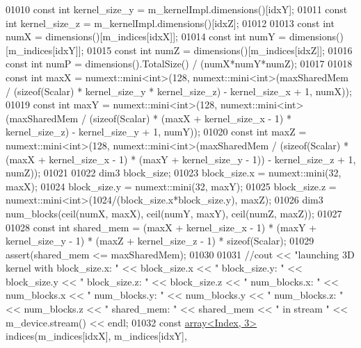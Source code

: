 \begin{DoxyCode}
01010         \textcolor{keyword}{const} \textcolor{keywordtype}{int} kernel\_size\_y = m\_kernelImpl.dimensions()[idxY];
01011         \textcolor{keyword}{const} \textcolor{keywordtype}{int} kernel\_size\_z = m\_kernelImpl.dimensions()[idxZ];
01012 
01013         \textcolor{keyword}{const} \textcolor{keywordtype}{int} numX = dimensions()[m\_indices[idxX]];
01014         \textcolor{keyword}{const} \textcolor{keywordtype}{int} numY = dimensions()[m\_indices[idxY]];
01015         \textcolor{keyword}{const} \textcolor{keywordtype}{int} numZ = dimensions()[m\_indices[idxZ]];
01016         \textcolor{keyword}{const} \textcolor{keywordtype}{int} numP = dimensions().TotalSize() / (numX*numY*numZ);
01017 
01018         \textcolor{keyword}{const} \textcolor{keywordtype}{int} maxX = numext::mini<int>(128, numext::mini<int>(maxSharedMem / (\textcolor{keyword}{sizeof}(Scalar) * 
      kernel\_size\_y * kernel\_size\_z) - kernel\_size\_x + 1, numX));
01019         \textcolor{keyword}{const} \textcolor{keywordtype}{int} maxY = numext::mini<int>(128, numext::mini<int>(maxSharedMem / (\textcolor{keyword}{sizeof}(Scalar) * (maxX + 
      kernel\_size\_x - 1) * kernel\_size\_z) - kernel\_size\_y + 1, numY));
01020         \textcolor{keyword}{const} \textcolor{keywordtype}{int} maxZ = numext::mini<int>(128, numext::mini<int>(maxSharedMem / (\textcolor{keyword}{sizeof}(Scalar) * (maxX + 
      kernel\_size\_x - 1) * (maxY + kernel\_size\_y - 1)) - kernel\_size\_z + 1, numZ));
01021 
01022         dim3 block\_size;
01023         block\_size.x = numext::mini(32, maxX);
01024         block\_size.y = numext::mini(32, maxY);
01025         block\_size.z = numext::mini<int>(1024/(block\_size.x*block\_size.y), maxZ);
01026         dim3 num\_blocks(ceil(numX, maxX), ceil(numY, maxY), ceil(numZ, maxZ));
01027 
01028         \textcolor{keyword}{const} \textcolor{keywordtype}{int} shared\_mem = (maxX + kernel\_size\_x - 1) * (maxY + kernel\_size\_y - 1) * (maxZ + 
      kernel\_size\_z - 1) * \textcolor{keyword}{sizeof}(Scalar);
01029         assert(shared\_mem <= maxSharedMem);
01030 
01031         \textcolor{comment}{//cout << "launching 3D kernel with block\_size.x: " << block\_size.x << " block\_size.y: " <<
       block\_size.y  << " block\_size.z: " << block\_size.z << " num\_blocks.x: " << num\_blocks.x << " num\_blocks.y: " <<
       num\_blocks.y << " num\_blocks.z: " << num\_blocks.z  << " shared\_mem: " << shared\_mem << " in stream " <<
       m\_device.stream() << endl;}
01032         \textcolor{keyword}{const} \hyperlink{class_eigen_1_1array}{array<Index, 3>} indices(m\_indices[idxX], m\_indices[idxY],

\end{DoxyCode}

